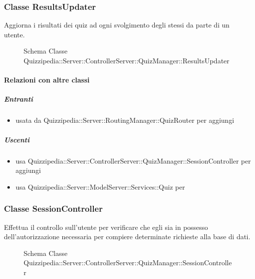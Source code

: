 \subsubsection{Classe ResultsUpdater}
Aggiorna i risultati dei quiz ad ogni svolgimento degli stessi da parte di un utente.
\begin{figure}[H]
\centering
\noindent{}
\caption[Schema Classe ResultsUpdater]{Schema Classe Quizzipedia::Server::ControllerServer::QuizManager::ResultsUpdater}
\end{figure}
\paragraph{Relazioni con altre classi}
\subparagraph{Entranti}
\begin{itemize}
\item usata da Quizzipedia::Server::RoutingManager::QuizRouter per aggiungi
\end{itemize}
\subparagraph{Uscenti}
\begin{itemize}
\item usa Quizzipedia::Server::ControllerServer::QuizManager::SessionController per aggiungi
\item usa Quizzipedia::Server::ModelServer::Services::Quiz per 
\end{itemize}
\subsubsection{Classe SessionController}
Effettua il controllo sull'utente per verificare che egli sia in possesso dell'autorizzazione necessaria per compiere determinate richieste alla base di dati.
\begin{figure}[H]
\centering
\noindent{}
\caption[Schema Classe SessionController]{Schema Classe Quizzipedia::Server::ControllerServer::QuizManager::SessionController}
\end{figure}

